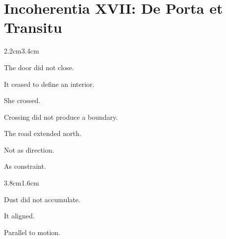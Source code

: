 
\chapter*{Incoherentia XVII: De Porta et Transitu}

\pagestyle{byobu-return}

\vspace{2em}

\begin{adjustwidth}{2.2cm}{3.4cm}

The door did not close.

\medskip

It ceased to define an interior.

\vspace{2em}

She crossed.

\medskip

Crossing did not produce a boundary.

\vspace{3em}


\vspace{3em}

The road extended north.

\medskip

Not as direction.

\medskip

As constraint.

\vspace{2em}

\end{adjustwidth}

\begin{adjustwidth}{3.8cm}{1.6cm}

Dust did not accumulate.

\medskip

It aligned.

\medskip

Parallel to motion.

\vspace{2em}


\vspace{3em}

\end{adjustwidth}

